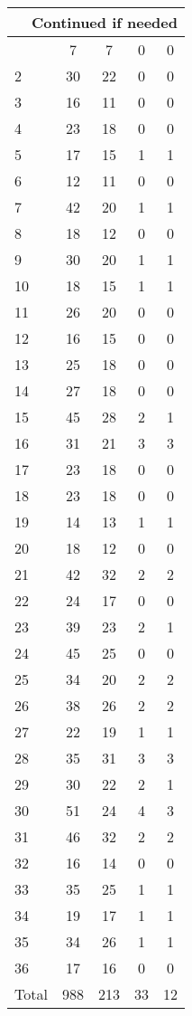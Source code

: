 \begin{center}
\begin{longtable}{l|c|c|c|c}
\hline \multicolumn{5}{|r|}{{Continued if needed}} \\ \hline
\endfoot 
1 & 7 & 7 & 0 & 0\\ \hline
2 & 30 & 22 & 0 & 0\\ \hline
3 & 16 & 11 & 0 & 0\\ \hline
4 & 23 & 18 & 0 & 0\\ \hline
5 & 17 & 15 & 1 & 1\\ \hline
6 & 12 & 11 & 0 & 0\\ \hline
7 & 42 & 20 & 1 & 1\\ \hline
8 & 18 & 12 & 0 & 0\\ \hline
9 & 30 & 20 & 1 & 1\\ \hline
10 & 18 & 15 & 1 & 1\\ \hline
11 & 26 & 20 & 0 & 0\\ \hline
12 & 16 & 15 & 0 & 0\\ \hline
13 & 25 & 18 & 0 & 0\\ \hline
14 & 27 & 18 & 0 & 0\\ \hline
15 & 45 & 28 & 2 & 1\\ \hline
16 & 31 & 21 & 3 & 3\\ \hline
17 & 23 & 18 & 0 & 0\\ \hline
18 & 23 & 18 & 0 & 0\\ \hline
19 & 14 & 13 & 1 & 1\\ \hline
20 & 18 & 12 & 0 & 0\\ \hline
21 & 42 & 32 & 2 & 2\\ \hline
22 & 24 & 17 & 0 & 0\\ \hline
23 & 39 & 23 & 2 & 1\\ \hline
24 & 45 & 25 & 0 & 0\\ \hline
25 & 34 & 20 & 2 & 2\\ \hline
26 & 38 & 26 & 2 & 2\\ \hline
27 & 22 & 19 & 1 & 1\\ \hline
28 & 35 & 31 & 3 & 3\\ \hline
29 & 30 & 22 & 2 & 1\\ \hline
30 & 51 & 24 & 4 & 3\\ \hline
31 & 46 & 32 & 2 & 2\\ \hline
32 & 16 & 14 & 0 & 0\\ \hline
33 & 35 & 25 & 1 & 1\\ \hline
34 & 19 & 17 & 1 & 1\\ \hline
35 & 34 & 26 & 1 & 1\\ \hline
36 & 17 & 16 & 0 & 0\\ \hline
\hline \hline
Total & 988 & 213 & 33 & 12



\end{longtable}
\end{center}


